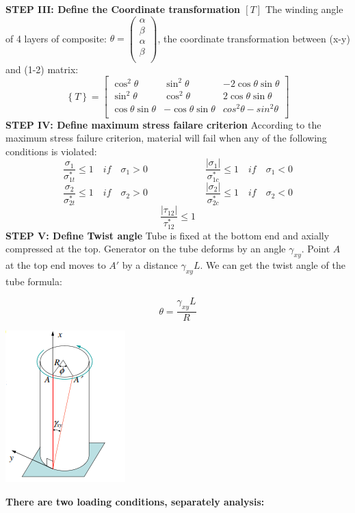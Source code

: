 \documentclass[12pt]{article}
\begin{document}
\noindent \textbf{STEP III: Define the Coordinate transformation $\left[ T \right]$}\newline
\noindent The winding angle of 4 layers of composite: $ \theta = \left( \begin{matrix}
	\alpha  \\
	\beta  \\
	\alpha  \\
	\beta	\\
	\end{matrix} \right)$, the coordinate transformation between (x-y) and (1-2) matrix:$$ \left\{ T \right\} = \left[\begin{matrix}
			\cos^2{\theta} & \sin^2{\theta} & -2\cos{\theta}\sin{\theta} \\
			\sin^2{\theta} & \cos^2{\theta} & 2\cos{\theta}\sin{\theta} \\
			\cos{\theta}\sin{\theta} & -\cos{\theta}\sin{\theta} & cos^2{\theta}-sin^2{\theta} \\
			\end{matrix} \right]$$\newline
\noindent \textbf{STEP IV: Define maximum stress failare criterion}\newline
\noindent According to the maximum stress failure criterion, material will fail when any of the following conditions is violated:
$$\frac{\sigma_1}{\sigma^*_{1t}} \leq 1 \quad if \quad \sigma_1 > 0 \qquad\qquad\qquad \frac{\left| \sigma_1 \right|}{\sigma^*_{1c}} \leq 1 \quad if \quad  \sigma_1 < 0$$
$$\frac{\sigma_2}{\sigma^*_{2t}} \leq 1 \quad if \quad \sigma_2 > 0 \qquad\qquad\qquad \frac{\left| \sigma_2 \right|}{\sigma^*_{2c}} \leq 1 \quad if \quad  \sigma_2 < 0$$
$$\frac{\left| \tau_{12} \right|}{\tau^*_{12}} \leq 1$$\hfill\newline
\noindent \textbf{STEP V: Define Twist angle}\newline
\noindent Tube is fixed at the bottom end and axially compressed at the top. Generator on the tube deforms by an angle $\gamma_{xy}$.
Point $A$ at the top end moves to $A'$ by a distance $\gamma_{xy}L$.
We can get the twist angle of the tube formula:\newline
\begin{minipage}[b]{0.7\linewidth}
	$$\theta = \frac{\gamma_{xy}L}{R}$$\newline\newline
	\end{minipage}
	\hfill
	\begin{minipage}[b]{0.3\linewidth}
		\includegraphics{twist.png}
\end{minipage}
\noindent\textbf{There are two loading conditions, separately analysis:}\newline
\end{document}
